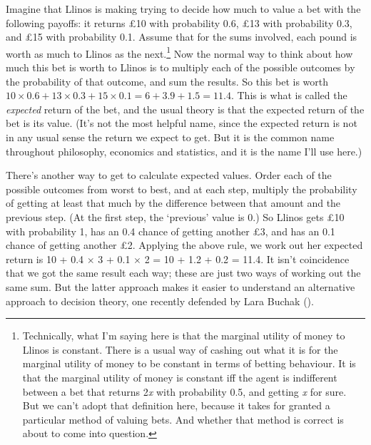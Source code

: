 \documentclass[
  10pt,
  letterpaper,
  twoside]{scrbook}
\begin{document}
Imagine that {Llinos} is making trying to decide how much to value a bet
with the following payoffs: it returns £10 with probability 0.6, £13
with probability 0.3, and £15 with probability 0.1. Assume that for the
sums involved, each pound is worth as much to {Llinos} as the
next.\footnote{Technically, what I'm saying here is that the marginal
  utility of money to {Llinos} is constant. There is a usual way of
  cashing out what it is for the marginal utility of money to be
  constant in terms of betting behaviour. It is that the marginal
  utility of money is constant iff the agent is indifferent between a
  bet that returns 2\emph{x} with probability 0.5, and getting \emph{x}
  for sure. But we can't adopt that definition here, because it takes
  for granted a particular method of valuing bets. And whether that
  method is correct is about to come into question.} Now the normal way
to think about how much this bet is worth to {Llinos} is to multiply
each of the possible outcomes by the probability of that outcome, and
sum the results. So this bet is worth
\(10 \times 0.6 + 13 \times 0.3 + 15 \times 0.1 = 6 + 3.9 + 1.5 = 11.4\).
This is what is called the \emph{expected} return of the bet, and the
usual theory is that the expected return of the bet is its value. (It's
not the most helpful name, since the expected return is not in any usual
sense the return we expect to get. But it is the common name throughout
philosophy, economics and statistics, and it is the name I'll use here.)

There's another way to get to calculate expected values. Order each of
the possible outcomes from worst to best, and at each step, multiply the
probability of getting at least that much by the difference between that
amount and the previous step. (At the first step, the `previous' value
is 0.) So {Llinos} gets £10 with probability 1, has an 0.4 chance of
getting another £3, and has an 0.1 chance of getting another £2.
Applying the above rule, we work out her expected return is 10 + 0.4
\(\times\) 3 + 0.1 \(\times\) 2 = 10 + 1.2 + 0.2 = 11.4. It isn't
coincidence that we got the same result each way; these are just two
ways of working out the same sum. But the latter approach makes it
easier to understand an alternative approach to decision theory, one
recently defended by Lara Buchak ().
\end{document}
